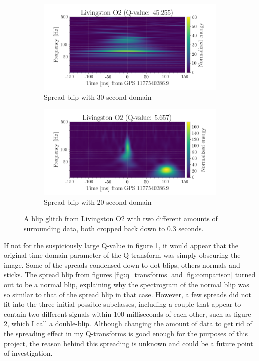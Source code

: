 \documentclass[a4paper]{article}
\begin{document}
\begin{figure}[h!]
	\centering
	\begin{subfigure}{.49\textwidth}
		\centering
		\includegraphics[width=1\linewidth]{spread_ex_30s}
		\caption{Spread blip with 30 second domain}
		\label{fig:spread_30}
	\end{subfigure}
	\begin{subfigure}{.49\textwidth}
		\centering
		\includegraphics[width=1\linewidth]{spread_ex_20s}
		\caption{Spread blip with 20 second domain}
		\label{fig:spread_20}
	\end{subfigure}
	\caption{A blip glitch from Livingston O2 with two different amounts of surrounding data, both cropped back down to 0.3 seconds.}%
	\label{fig:spread_ex}
\end{figure}

If not for the suspiciously large Q-value in figure \ref{fig:spread_30}, it would appear that the original time domain parameter of the Q-transform was simply obscuring the image. Some of the spreads condensed down to dot blips, others normals and sticks. The spread blip from figures \ref{fig:q_transforms} and \ref{fig:comparison} turned out to be a normal blip, explaining why the spectrogram of the normal blip was so similar to that of the spread blip in that case. However, a few spreads did not fit into the three initial possible subclasses, including a couple that appear to contain two different signals within 100 milliseconds of each other, such as figure \ref{fig:spread_20}, which I call a double-blip. Although changing the amount of data to get rid of the spreading effect in my Q-transforms is good enough for the purposes of this project, the reason behind this spreading is unknown and could be a future point of investigation.
\end{document}
